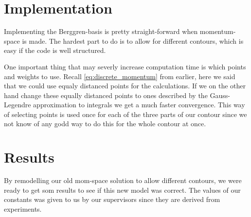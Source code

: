 
\section{Implementation}
Implementing the Berggren-basis is pretty straight-forward when momentum-space is made.
The hardest part to do is to allow for different contours, which is easy if the code is well structured.

One important thing that may severly increase computation time is which points and weights to use.
Recall \cref{eq:discrete_momentum} from earlier, here we said that we could use equaly distanced points for the calculations.
If we on the other hand change these equally distanced points to ones described by the Gauss-Legendre approximation to integrals we get a much faster convergence.
This way of selecting points is used once for each of the three parts of our contour since we not know of any godd way to do this for the whole contour at once.



\section{Results}
By remodelling our old mom-space solution to allow different contours, we were ready to get som results to see if this new model was correct. The values of our constants was given to us by our supervisors since they are derived from experiments.
